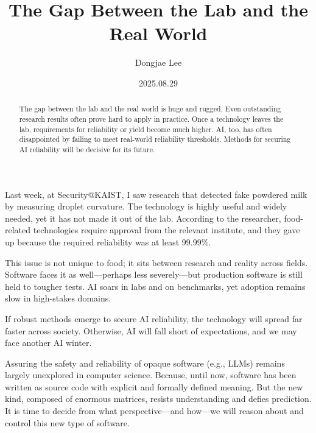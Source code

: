\documentclass[11pt, oneside]{article}      %
\title{The Gap Between the Lab and the Real World}
\author{Dongjae Lee}
\date{2025.08.29}
\begin{document}
\maketitle


\begin{abstract}
	The gap between the lab and the real world is huge and rugged.
	Even outstanding research results often prove hard to apply in practice.
	Once a technology leaves the lab, requirements for reliability or yield become much higher.
	AI, too, has often disappointed by failing to meet real-world reliability thresholds.
	Methods for securing AI reliability will be decisive for its future.
\end{abstract}

Last week, at Security@KAIST, I saw research that detected fake powdered milk  by measuring droplet curvature.
The technology is highly useful and widely needed, yet it has not made it out of the lab.
According to the researcher, food-related technologies require approval from the relevant institute, and they gave up because the required reliability was at least 99.99\%.

This issue is not unique to food; it sits between research and reality across fields.
Software faces it as well—perhaps less severely—but production software is still held to tougher tests.
AI soars in labs and on benchmarks, yet adoption remains slow in high-stakes domains.

If robust methods emerge to secure AI reliability, the technology will spread far faster across society.
Otherwise, AI will fall short of expectations, and we may face another AI winter.

Assuring the safety and reliability of opaque software (e.g., LLMs) remains largely unexplored in computer science.
Because, until now, software has been written as source code with explicit and formally defined meaning.
But the new kind, composed of enormous matrices, resists understanding and defies prediction.
It is time to decide from what perspective—and how—we will reason about and control this new type of software.
\end{document}
